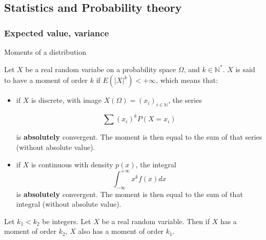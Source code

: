 \documentclass[
10pt, %
a4paper, %
oneside, %
headinclude,footinclude, %
BCOR5mm, %
]{scrartcl}
\begin{document}
\subsection{\large\color{MidnightBlue}Statistics and Probability theory}

\subsubsection{\large\color{Periwinkle}Expected value, variance}

\begin{definition}{Moments of a distribution}

    Let $X$ be a real random variabe on a probability space $\Omega$, and $k\in \mathbb{N}^*$. $X$ is said to have a moment of order $k$ if $E(|X|^k)<+\infty$, which means that:
    \begin{itemize}
	\item if $X$ is discrete, with image $X(\Omega)=(x_i)_{i\in \mathbb{N} }$, the series

	    \begin{equation*}
		\sum (x_i)^kP(X=x_i)
	    \end{equation*}

	    is \textbf{{absolutely}}  convergent. The moment is then equal to the sum of that series (without absolute value).
	\item if $X$ is continuous with density $p(x)$, the integral
	    \begin{equation*}
	        \int^{+\infty}_{-\infty} x^kf(x)  dx 
	    \end{equation*}
	    is \textbf{{absolutely}}  convergent. The moment is then equal to the sum of that integral (without absolute value).
    \end{itemize}
\end{definition}

\begin{proposition}


    Let $k_1<k_2$ be integers. Let $X$ be a real random variable. Then if $X$ has a moment of order $k_2$, $X$ also has a moment of order $k_1$.
    
\end{proposition}
\end{document}
